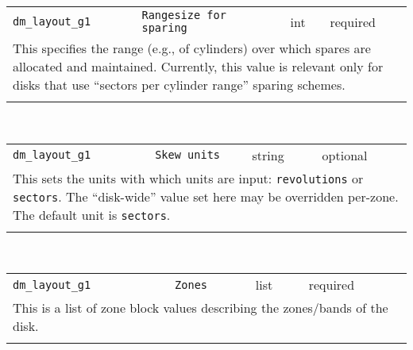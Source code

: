 \noindent 
\begin{tabular}{|p{\lpmodwidth}|p{\lpnamewidth}|p{0.5in}|p{0.5in}|}
\cline{1-4}
\texttt{dm\_layout\_g1} & \texttt{Rangesize for sparing} & int & required \\ 
\cline{1-4}
\multicolumn{4}{|p{6in}|}{
This specifies the range (e.g., of cylinders) over which spares are
allocated and maintained. Currently, this value is relevant only for
disks that use ``sectors per cylinder range'' sparing schemes.
}\\ 
\cline{1-4}
\multicolumn{4}{p{5in}}{}\\
\end{tabular}\\ 
\noindent 
\begin{tabular}{|p{\lpmodwidth}|p{\lpnamewidth}|p{0.5in}|p{0.5in}|}
\cline{1-4}
\texttt{dm\_layout\_g1} & \texttt{Skew units} & string & optional \\ 
\cline{1-4}
\multicolumn{4}{|p{6in}|}{
This sets the units with which units are input: \texttt{revolutions} or
\texttt{sectors}. The ``disk-wide'' value set here may be overridden
per-zone. The default unit is \texttt{sectors}.
}\\ 
\cline{1-4}
\multicolumn{4}{p{5in}}{}\\
\end{tabular}\\ 
\noindent 
\begin{tabular}{|p{\lpmodwidth}|p{\lpnamewidth}|p{0.5in}|p{0.5in}|}
\cline{1-4}
\texttt{dm\_layout\_g1} & \texttt{Zones} & list & required \\ 
\cline{1-4}
\multicolumn{4}{|p{6in}|}{
This is a list of zone block values describing the zones/bands of the disk.
}\\ 
\cline{1-4}
\multicolumn{4}{p{5in}}{}\\
\end{tabular}\\ 
